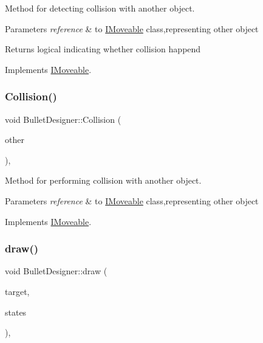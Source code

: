 Method for detecting collision with another object. 


\begin{DoxyParams}{Parameters}
{\em reference} & to \mbox{\hyperlink{class_i_moveable}{I\+Moveable}} class,representing other object \\
\hline
\end{DoxyParams}
\begin{DoxyReturn}{Returns}
logical indicating whether collision happend 
\end{DoxyReturn}


Implements \mbox{\hyperlink{class_i_moveable}{I\+Moveable}}.

\mbox{\label{class_bullet_designer_a360def48f566d8c863b1355b1cb69bad}} 
\subsubsection{\texorpdfstring{Collision()}{Collision()}}
{\footnotesize\ttfamily void Bullet\+Designer\+::\+Collision (\begin{DoxyParamCaption}\item[{\mbox{\hyperlink{class_i_moveable}{I\+Moveable}} $\ast$}]{other }\end{DoxyParamCaption})\hspace{0.3cm}{\ttfamily [override]}, {\ttfamily [virtual]}}



Method for performing collision with another object. 


\begin{DoxyParams}{Parameters}
{\em reference} & to \mbox{\hyperlink{class_i_moveable}{I\+Moveable}} class,representing other object \\
\hline
\end{DoxyParams}


Implements \mbox{\hyperlink{class_i_moveable}{I\+Moveable}}.

\mbox{\label{class_bullet_designer_a5f920adb548d1e7d5e99394bebc08ec1}} 
\subsubsection{\texorpdfstring{draw()}{draw()}}
{\footnotesize\ttfamily void Bullet\+Designer\+::draw (\begin{DoxyParamCaption}\item[{sf\+::\+Render\+Target \&}]{target,  }\item[{sf\+::\+Render\+States}]{states }\end{DoxyParamCaption})\hspace{0.3cm}{\ttfamily [override]}, {\ttfamily [virtual]}}




